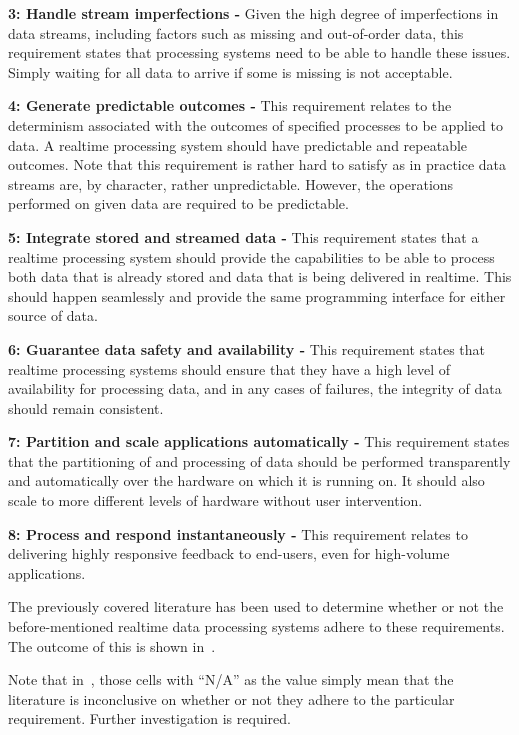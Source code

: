\noindent \textbf{3: Handle stream imperfections -} Given the high degree of imperfections in data streams, including
factors such as missing and out-of-order data, this requirement states that processing systems need to be able to handle
these issues. Simply waiting for all data to arrive if some is missing is not acceptable.

\noindent \textbf{4: Generate predictable outcomes -} This requirement relates to the determinism associated with the
outcomes of specified processes to be applied to data. A realtime processing system should have predictable and repeatable
outcomes. Note that this requirement is rather hard to satisfy as in practice data streams are, by character, rather
unpredictable. However, the operations performed on given data are required to be predictable.

\noindent \textbf{5: Integrate stored and streamed data -} This requirement states that a realtime processing system
should provide the capabilities to be able to process both data that is already stored and data that is being delivered
in realtime. This should happen seamlessly and provide the same programming interface for either source of data.

\noindent \textbf{6: Guarantee data safety and availability -} This requirement states that realtime processing systems
should ensure that they have a high level of availability for processing data, and in any cases of failures, the integrity
of data should remain consistent.

\noindent \textbf{7: Partition and scale applications automatically -} This requirement states that the partitioning of
and processing of data should be performed transparently and automatically over the hardware on which it is running on.
It should also scale to more different levels of hardware without user intervention.

\noindent \textbf{8: Process and respond instantaneously -} This requirement relates to delivering highly responsive
feedback to end-users, even for high-volume applications.

The previously covered literature has been used to determine whether or not the before-mentioned realtime data processing
systems adhere to these requirements. The outcome of this is shown in~.

Note that in~, those cells with ``N/A'' as the value simply mean that the literature
is inconclusive on whether or not they adhere to the particular requirement. Further investigation is required.

